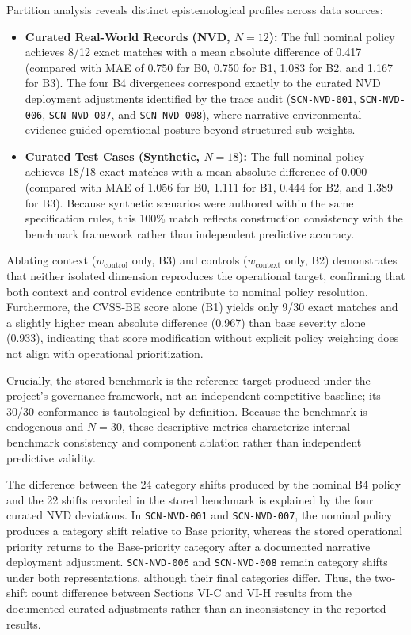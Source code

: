 \documentclass[conference]{IEEEtran}
\begin{document}
Partition analysis reveals distinct epistemological profiles across data sources:
\begin{itemize}
    \item \textbf{Curated Real-World Records (NVD, $N=12$):} The full nominal policy achieves 8/12 exact matches with a mean absolute difference of 0.417 (compared with MAE of 0.750 for B0, 0.750 for B1, 1.083 for B2, and 1.167 for B3). The four B4 divergences correspond exactly to the curated NVD deployment adjustments identified by the trace audit (\texttt{SCN-NVD-001}, \texttt{SCN-NVD-006}, \texttt{SCN-NVD-007}, and \texttt{SCN-NVD-008}), where narrative environmental evidence guided operational posture beyond structured sub-weights.
    \item \textbf{Curated Test Cases (Synthetic, $N=18$):} The full nominal policy achieves 18/18 exact matches with a mean absolute difference of 0.000 (compared with MAE of 1.056 for B0, 1.111 for B1, 0.444 for B2, and 1.389 for B3). Because synthetic scenarios were authored within the same specification rules, this 100\% match reflects construction consistency with the benchmark framework rather than independent predictive accuracy.
\end{itemize}

Ablating context ($w_{\text{control}}$ only, B3) and controls ($w_{\text{context}}$ only, B2) demonstrates that neither isolated dimension reproduces the operational target, confirming that both context and control evidence contribute to nominal policy resolution. Furthermore, the CVSS-BE score alone (B1) yields only 9/30 exact matches and a slightly higher mean absolute difference (0.967) than base severity alone (0.933), indicating that score modification without explicit policy weighting does not align with operational prioritization.

Crucially, the stored benchmark is the reference target produced under the project's governance framework, not an independent competitive baseline; its 30/30 conformance is tautological by definition. Because the benchmark is endogenous and $N=30$, these descriptive metrics characterize internal benchmark consistency and component ablation rather than independent predictive validity.

The difference between the 24 category shifts produced by the nominal B4 policy and the 22 shifts recorded in the stored benchmark is explained by the four curated NVD deviations. In \texttt{SCN-NVD-001} and \texttt{SCN-NVD-007}, the nominal policy produces a category shift relative to Base priority, whereas the stored operational priority returns to the Base-priority category after a documented narrative deployment adjustment. \texttt{SCN-NVD-006} and \texttt{SCN-NVD-008} remain category shifts under both representations, although their final categories differ. Thus, the two-shift count difference between Sections VI-C and VI-H results from the documented curated adjustments rather than an inconsistency in the reported results.
\end{document}

